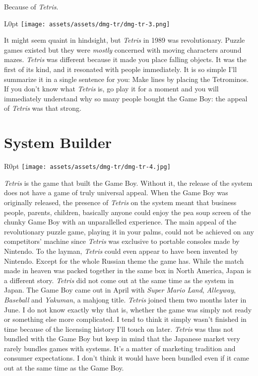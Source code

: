 \documentclass{book}
\begin{document}
Because of \emph{Tetris}.

\begin{wrapfigure}{L}{0pt} \texttt{[image: assets/assets/dmg-tr/dmg-tr-3.png]}\end{wrapfigure}
It might seem quaint in hindsight, but \emph{Tetris} in 1989 was revolutionary. Puzzle games existed but they were \emph{mostly} concerned with moving characters around mazes. \emph{Tetris} was different because it made you place falling objects. It was the first of its kind, and it resonated with people immediately. It is so simple I’ll summarize it in a single sentence for you: Make lines by placing the Tetrominos. If you don’t know what \emph{Tetris} is, go play it for a moment and you will immediately understand why so many people bought the Game Boy: the appeal of \emph{Tetris} was that strong.

\FloatBarrier\needspace{10mm}\section*{System Builder}\nopagebreak[4]

\begin{wrapfigure}{R}{0pt} \texttt{[image: assets/assets/dmg-tr/dmg-tr-4.jpg]}\end{wrapfigure}
\emph{Tetris} is the game that built the Game Boy. Without it, the release of the system does not have a game of truly universal appeal. When the Game Boy was originally released, the presence of \emph{Tetris} on the system meant that business people, parents, children, basically anyone could enjoy the pea soup screen of the chunky Game Boy with an unparallelled experience. The main appeal of the revolutionary puzzle game, playing it in your palms, could not be achieved on any competitors’ machine since \emph{Tetris} was exclusive to portable consoles made by Nintendo. To the layman, \emph{Tetris} could even appear to have been invented by Nintendo. Except for the whole Russian theme the game has. While the match made in heaven was packed together in the same box in North America, Japan is a different story. \emph{Tetris} did not come out at the same time as the system in Japan. The Game Boy came out in April with \emph{Super Mario Land}, \emph{Alleyway}, \emph{Baseball} and \emph{Yakuman}, a mahjong title. \emph{Tetris} joined them two months later in June. I do not know exactly why that is, whether the game was simply not ready or something else more complicated. I tend to think it simply wasn’t finished in time because of the licensing history I’ll touch on later. \emph{Tetris} was thus not bundled with the Game Boy but keep in mind that the Japanese market very rarely bundles games with systems. It’s a matter of marketing tradition and consumer expectations. I don’t think it would have been bundled even if it came out at the same time as the Game Boy.
\end{document}
